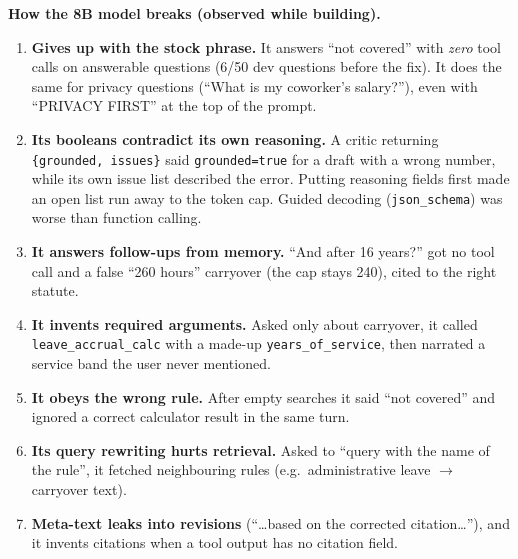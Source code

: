 
\textbf{How the 8B model breaks (observed while building).}
\begin{enumerate}
\item \textbf{Gives up with the stock phrase.} It answers ``not covered'' with \emph{zero} tool calls on answerable
questions (6/50 dev questions before the fix). It does the same for privacy questions (``What is my coworker's
salary?''), even with ``PRIVACY FIRST'' at the top of the prompt.
\item \textbf{Its booleans contradict its own reasoning.} A critic returning \texttt{\{grounded, issues\}} said
\texttt{grounded=true} for a draft with a wrong number, while its own issue list described the error. Putting
reasoning fields first made an open list run away to the token cap. Guided decoding (\texttt{json\_schema}) was
worse than function calling.
\item \textbf{It answers follow-ups from memory.} ``And after 16 years?'' got no tool call and a false
``260 hours'' carryover (the cap stays 240), cited to the right statute.
\item \textbf{It invents required arguments.} Asked only about carryover, it called \texttt{leave\_accrual\_calc}
with a made-up \texttt{years\_of\_service}, then narrated a service band the user never mentioned.
\item \textbf{It obeys the wrong rule.} After empty searches it said ``not covered'' and ignored a correct
calculator result in the same turn.
\item \textbf{Its query rewriting hurts retrieval.} Asked to ``query with the name of the rule'', it fetched
neighbouring rules (e.g.\ administrative leave $\to$ carryover text).
\item \textbf{Meta-text leaks into revisions} (``\ldots based on the corrected citation\ldots''), and it invents
citations when a tool output has no citation field.
\end{enumerate}
